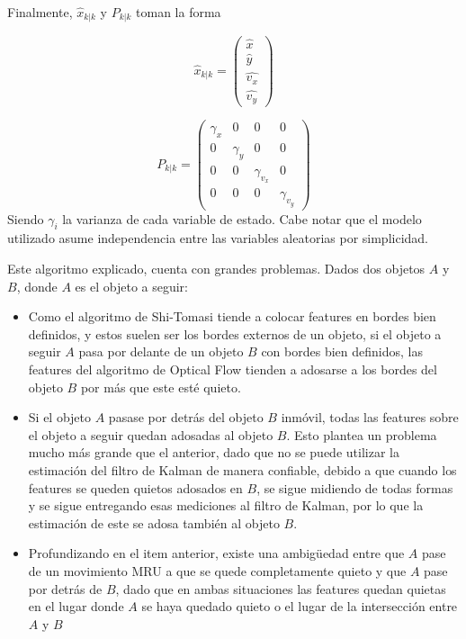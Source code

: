 Finalmente, $\hat{x}_{k|k}$ y $P_{k|k}$ toman la forma

\begin{equation}
\hat{x}_{k|k} = 
\begin{pmatrix}
\hat{x}\\
\hat{y}\\
\hat{v_x}\\
\hat{v_y}
\end{pmatrix}
\end{equation}

\begin{equation}
P_{k|k} = 
\begin{pmatrix}
\gamma_{x} & 0 & 0  & 0\\
0 & \gamma_{y}  & 0 & 0\\
0 & 0  & \gamma_{v_x}  & 0\\
0 & 0  & 0  & \gamma_{v_y} 
\end{pmatrix}
\end{equation}
Siendo $\gamma_{i}$ la varianza de cada variable de estado. Cabe notar que el modelo utilizado asume independencia entre las variables aleatorias por simplicidad.

Este algoritmo explicado, cuenta con grandes problemas. Dados dos objetos $A$ y $B$, donde $A$ es el objeto a seguir:

\begin{itemize}
\item Como el algoritmo de Shi-Tomasi tiende a colocar features en bordes bien definidos, y estos suelen ser los bordes externos de un objeto, si el objeto a seguir $A$ pasa por delante de un objeto $B$ con bordes bien definidos, las features del algoritmo de Optical Flow tienden a adosarse a los bordes del objeto $B$ por más que este esté quieto.
\item Si el objeto $A$ pasase por detrás del objeto $B$ inmóvil, todas las features sobre el objeto a seguir quedan adosadas al objeto $B$. Esto plantea un problema mucho más grande que el anterior, dado que no se puede utilizar la estimación del filtro de Kalman de manera confiable, debido a que cuando los features se queden quietos adosados en $B$, se sigue midiendo de todas formas y se sigue entregando esas mediciones al filtro de Kalman, por lo que la estimación de este se adosa también al objeto $B$.
\item Profundizando en el item anterior, existe una ambigüedad entre que $A$ pase de un movimiento MRU a que se quede completamente quieto y que $A$ pase por detrás de $B$, dado que en ambas situaciones las features quedan quietas en el lugar donde $A$ se haya quedado quieto o el lugar de la intersección entre $A$ y $B$
\end{itemize}


